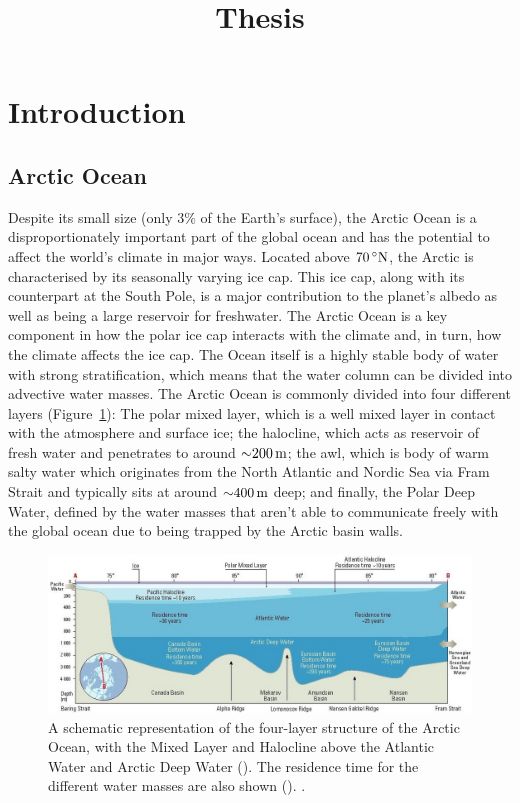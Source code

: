 \documentclass[10pt,a4paper]{article}
\title{Thesis}
\begin{document}
\maketitle


\section{Introduction}

\glsresetall

\subsection{Arctic Ocean}


Despite its small size (only $3\%$ of the Earth's surface), the Arctic
Ocean is a disproportionately important part of the global ocean and has the potential
to affect the world's climate in major ways. Located above
$70\,^{\circ}{\rm N}$, the Arctic is characterised by its seasonally
varying ice cap. This ice cap, along with its counterpart at the South
Pole, is a major contribution to the planet's albedo as well as being
a large reservoir for freshwater. The Arctic Ocean is a key component
in how the polar ice cap interacts with the climate and, in turn, how
the climate affects the ice cap. 
The Ocean itself is a highly stable body of water with strong stratification, 
which means that the water column can be divided into advective water masses.
The Arctic Ocean is commonly divided into four different layers (Figure~\ref{fig:amap}):
The polar mixed layer, which is a well mixed layer in
contact with the atmosphere and surface ice; the halocline, which acts as
reservoir of fresh water and penetrates to around ${\sim}200\,{\rm m}$; the \gls{awl},
which is body of warm salty water which originates from the North Atlantic and Nordic 
Sea via Fram Strait and typically sits at around ${\sim}400\,{\rm m}$ deep; and finally, 
the Polar Deep Water, defined by the water masses that aren't
able to communicate freely with the global ocean due to being trapped by the Arctic basin walls.



\begin{figure}
	\centering
	\includegraphics[width=\linewidth]{amap}
	\caption[\cite{wilson1998amap}]{  A schematic representation of the four-layer structure of the Arctic Ocean, with the Mixed Layer and Halocline
		above the Atlantic Water and Arctic Deep Water (\cite{aagaard1989role}). 
		The residence time for the different water masses are also shown (\cite{bonisch1995deep}). \cite{wilson1998amap}.}
	\label{fig:amap}
\end{figure}
\end{document}
